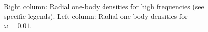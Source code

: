 \begin{figure}
\begin{center}
\begin{tabular}{lr}
  \end{tabular}
  \caption{Right column: Radial one-body densities for high frequencies (see specific legends). Left column: Radial one-body densities for $\omega=0.01$.}
  \label{fig:OBD_collapsed_w001}
 \end{center}
\end{figure}

\captionsetup[subfloat]{labelformat=empty}
% 


